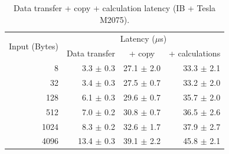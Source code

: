 \documentclass[journal]{IEEEtran}
\begin{document}
\begin{table}[!t]
  \centering
  \begin{tabular}{|r||r|r|r|}
    \hline

    \multirow{2}{*}{Input (Bytes)} & \multicolumn{3}{|c|}{ Latency  ($\mu$s)}  \\     
    
                                   & \multicolumn{1}{|c|}{Data transfer}
                                   & \multicolumn{1}{|c|}{+ copy}
                                   & \multicolumn{1}{|c|}{+ calculations} \\

    \hline
    \hline
     8    & 3.3 $\pm$ 0.3   & 27.1 $\pm$ 2.0 & 33.3 $\pm$ 2.1\\
     32   & 3.4 $\pm$ 0.3   & 27.5 $\pm$ 0.7 & 33.2 $\pm$ 2.0\\
     128  & 6.1 $\pm$ 0.3  & 29.6 $\pm$ 0.7 & 35.7 $\pm$ 2.0\\
     512  & 7.0 $\pm$ 0.2  & 30.8 $\pm$ 0.7 & 36.5 $\pm$ 2.6\\
     1024 & 8.3 $\pm$ 0.2  & 32.6 $\pm$ 1.7 & 37.9 $\pm$ 2.7\\
     4096 &  13.4 $\pm$ 0.3 &  39.1 $\pm$ 2.2 & 45.8 $\pm$ 2.1\\
%     
    \hline
  \end{tabular}
\caption{Data transfer + copy + calculation latency (IB + Tesla M2075).}
\label{tab_TF_IB}
\end{table}
\end{document}
